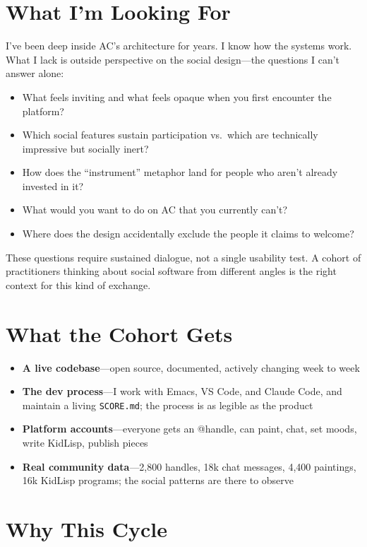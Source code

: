 \documentclass[10pt,letterpaper,twocolumn]{article}
\begin{document}
\section*{What I'm Looking For}

I've been deep inside AC's architecture for years. I know how the systems work. What I lack is outside perspective on the social design---the questions I can't answer alone:

\begin{itemize}
  \item What feels inviting and what feels opaque when you first encounter the platform?
  \item Which social features sustain participation vs.\ which are technically impressive but socially inert?
  \item How does the ``instrument'' metaphor land for people who aren't already invested in it?
  \item What would you want to do on AC that you currently can't?
  \item Where does the design accidentally exclude the people it claims to welcome?
\end{itemize}

These questions require sustained dialogue, not a single usability test. A cohort of practitioners thinking about social software from different angles is the right context for this kind of exchange.

\section*{What the Cohort Gets}

\begin{itemize}
  \item \textbf{A live codebase}---open source, documented, actively changing week to week
  \item \textbf{The dev process}---I work with Emacs, VS Code, and Claude Code, and maintain a living \texttt{SCORE.md}; the process is as legible as the product
  \item \textbf{Platform accounts}---everyone gets an @handle, can paint, chat, set moods, write KidLisp, publish pieces
  \item \textbf{Real community data}---2,800 handles, 18k chat messages, 4,400 paintings, 16k KidLisp programs; the social patterns are there to observe
\end{itemize}

\section*{Why This Cycle}
\end{document}
